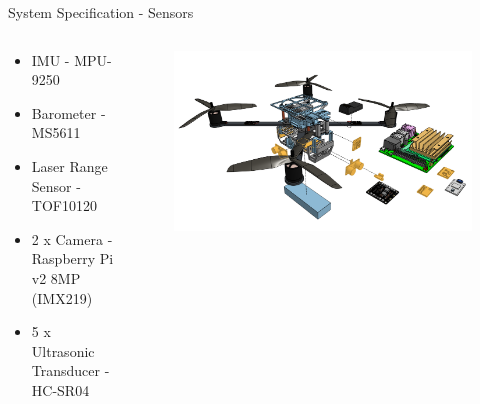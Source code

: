 \begin{frame}{System Specification - Sensors}


    \begin{columns}
        \begin{column}{0.4\textwidth}
        \begin{itemize}
            \item IMU - MPU-9250
            \item Barometer - MS5611
            \item Laser Range Sensor - TOF10120
            \item 2 x Camera - Raspberry Pi v2 8MP (IMX219)
            \item 5 x Ultrasonic Transducer - HC-SR04
        \end{itemize}
        \end{column}
        \begin{column}{0.6\textwidth}  %
            \begin{figure}
                \centering
                \includegraphics[width=1\textwidth]{img/exploded-sensors.png}
                \label{fig:sensors}
            \end{figure}
        \end{column}
    \end{columns}
\end{frame}

